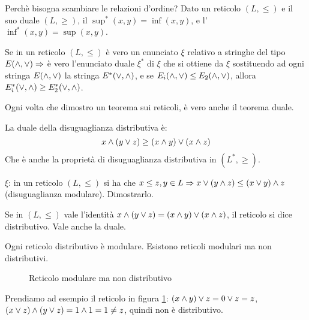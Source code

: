 Perch\`e bisogna scambiare le relazioni d'ordine? Dato un reticolo $(L, \le)$ e il suo duale $(L, \ge)$, il $\sup^{\ast} (x,y) = \inf(x,y)$, e l'$\inf^{\ast}(x,y) = \sup(x,y)$.

\begin{theorem}[Dualit\`a]
Se in un reticolo $(L, \le)$ \`e vero un enunciato $\xi$ relativo a stringhe del tipo $E(\wedge, \vee) \Rightarrow $ \`e vero l'enunciato duale $\xi^{\ast}$ di $\xi$ che si ottiene da $\xi$ sostituendo ad ogni stringa $E(\wedge, \vee)$ la stringa $E^{\ast}(\vee, \wedge)$, e se $E_i (\wedge, \vee) \le E_2 (\wedge, \vee)$, allora $E_i^{\ast} (\vee, \wedge) \ge E_2^{\ast} (\vee, \wedge)$.
\end{theorem}
Ogni volta che dimostro un teorema sui reticoli, \`e vero anche il teorema duale. 

La duale della disuguaglianza distributiva \`e:
\[
x \wedge (y \vee z) \ge (x \wedge y) \vee (x \wedge z)
\]
Che \`e anche la propriet\`a di disuguaglianza distributiva in $(L^{\ast}, \ge)$.

\begin{esercizio}
$\xi$: in un reticolo $(L, \le)$ si ha che $x \le z, y \in L \Rightarrow x \vee (y \wedge z) \le (x \vee y) \wedge z$ (disuguaglianza modulare). Dimostrarlo.
\end{esercizio}

\begin{defn}
Se in $(L, \le)$ vale l'identit\`a $x \wedge (y \vee z) = (x \wedge y) \vee (x \wedge z)$, il reticolo si dice distributivo. Vale anche la duale.
\end{defn}

Ogni reticolo distributivo \`e modulare. Esistono reticoli modulari ma non distributivi.

\begin{figure}[ht]
\centering
{}
\caption{\label{fig:mod_not_distr}Reticolo modulare ma non distributivo}
\end{figure}
Prendiamo ad esempio il reticolo in figura \ref{fig:mod_not_distr}: $(x \wedge y) \vee z = 0 \vee z = z$, $(x \vee z) \wedge (y \vee z) = 1 \wedge 1 = 1 \neq z$, quindi non \`e distributivo. 

